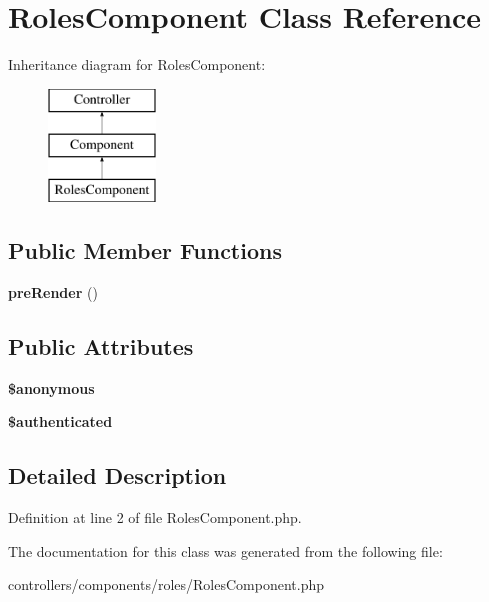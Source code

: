 \hypertarget{class_roles_component}{
\section{RolesComponent Class Reference}
\label{class_roles_component}
}
Inheritance diagram for RolesComponent:\begin{figure}[H]
\begin{center}
\leavevmode
\includegraphics[height=3.000000cm]{class_roles_component}
\end{center}
\end{figure}
\subsection*{Public Member Functions}
\begin{DoxyCompactItemize}
\item 
\hypertarget{class_roles_component_a501ee7309053dcd603f9b2072cfb4850}{
{\bfseries preRender} ()}
\label{class_roles_component_a501ee7309053dcd603f9b2072cfb4850}

\end{DoxyCompactItemize}
\subsection*{Public Attributes}
\begin{DoxyCompactItemize}
\item 
\hypertarget{class_roles_component_ad840d4a86e07c01633b4d9abe8e0b310}{
{\bfseries \$anonymous}}
\label{class_roles_component_ad840d4a86e07c01633b4d9abe8e0b310}

\item 
\hypertarget{class_roles_component_a0413f976bd2cb52cc477f8fe710c24ad}{
{\bfseries \$authenticated}}
\label{class_roles_component_a0413f976bd2cb52cc477f8fe710c24ad}

\end{DoxyCompactItemize}


\subsection{Detailed Description}


Definition at line 2 of file RolesComponent.php.



The documentation for this class was generated from the following file:\begin{DoxyCompactItemize}
\item 
controllers/components/roles/RolesComponent.php\end{DoxyCompactItemize}
